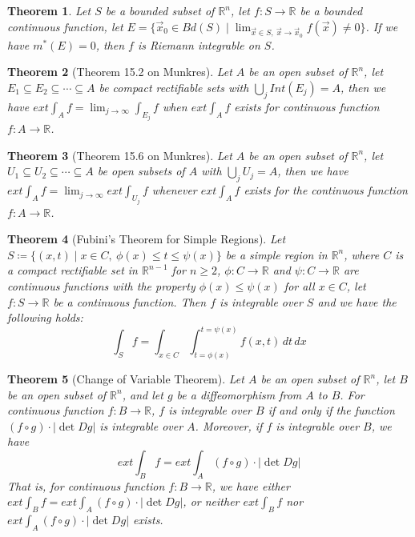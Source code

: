 \documentclass[11pt]{article}
\theoremstyle{break}
\theoremstyle{break}
\newtheorem{thm}{Theorem}[section]
\newcommand{\R}{\mathbb{R}}
\begin{document}
\begin{thm}
Let $S$ be a bounded subset of $\R^n$, let $f:S \to \R$ be a bounded continuous function, let $E = \{ \vec{x}_0 \in Bd(S) \mid\lim_{\vec{x}\in S,\ \vec{x}\to \vec{x}_0} f(\vec{x}) \neq 0 \}$. If we have $m^*(E) = 0$, then $f$ is Riemann integrable on $S$. 
\end{thm}

\begin{thm}[Theorem 15.2 on Munkres]
Let $A$ be an open subset of $\R^n$, let $E_1 \subseteq E_2\subseteq \cdots \subseteq A$ be compact rectifiable sets with $\bigcup_j Int(E_j) = A$, then we have $ext\int_A f = \lim_{j\to \infty} \int_{E_j} f$ when $ext\int_A f $ exists for continuous function $f:A \to \R$.
\end{thm}

\begin{thm}[Theorem 15.6 on Munkres] 
Let $A$ be an open subset of $\R^n$, let $U_1 \subseteq U_2 \subseteq \cdots \subseteq A$ be open subsets of $A$ with $\bigcup_j U_j = A$, then we have $ext \int_A f = \lim_{j \to \infty} ext \int_{U_j} f$ whenever $ext\int_A f $ exists for the continuous function $f:A \to \R$. 
\end{thm}

\begin{thm}[Fubini's Theorem for Simple Regions]
Let $S\coloneqq \{(x,t) \mid x \in C,\ \phi(x) \leq t \leq \psi(x)\}$ be a simple region in $\R^n$, where $C$ is a compact rectifiable set in $\R^{n-1}$ for $n \geq 2$, $\phi:C \to \R$ and $\psi:C \to \R$ are continuous functions with the property $\phi(x) \leq \psi(x)$ for all $x \in C$, let $f:S \to \R$ be a continuous function. Then $f$ is integrable over $S$ and we have the following holds: 
$$\int_S f = \int_{x \in C} \int_{t=\phi(x)}^{t=\psi(x)} f(x,t)\, dt\, dx$$
\end{thm}

\begin{thm}[Change of Variable Theorem]
Let $A$ be an open subset of $\R^n$, let $B$ be an open subset of $\R^n$, and let $g$ be a diffeomorphism from $A$ to $B$. For continuous function $f:B\to \R$, $f$ is integrable over $B$ if and only if the function $(f\circ g) \cdot |\det Dg|$ is integrable over $A$. Moreover, if $f$ is integrable over $B$, we have $$ext \int_B f = ext \int_A (f\circ g) \cdot |\det Dg|$$ 
That is, for continuous function $f:B \to \R$, we have either $ext \int_B f = ext \int_A (f\circ g) \cdot |\det Dg|$, or neither $ext \int_B f$ nor $ext \int_A (f\circ g) \cdot |\det Dg|$ exists.
\end{thm}
\end{document}
